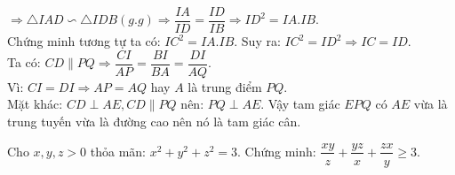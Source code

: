 \begin{ex}
{\begin{enumerate}[a)]
$\Rightarrow \triangle IAD\backsim \triangle IDB(g.g)\Rightarrow \dfrac{IA}{ID}=\dfrac{ID}{IB}\Rightarrow ID^2=IA.IB$.\\
Chứng minh tương tự ta có: $IC^2=IA.IB$. Suy ra: $IC^2=ID^2\Rightarrow IC=ID$.\\
Ta có: $CD\parallel PQ\Rightarrow \dfrac{CI}{AP}=\dfrac{BI}{BA}=\dfrac{DI}{AQ}$.\\
Vì: $CI = DI\Rightarrow AP=AQ$ hay $A$ là trung điểm $PQ$.\\
Mặt khác: $CD\perp AE, CD\parallel PQ$ nên: $PQ\perp AE$. Vậy tam giác $EPQ$ có $AE$ vừa là trung tuyến vừa là đường cao nên nó là tam giác cân.
\end{enumerate}
}
\end{ex}

\begin{ex}%
Cho $x,y,z>0$ thỏa mãn: $x^2+y^2+z^2=3$. Chứng minh:
$\dfrac{xy}{z}+\dfrac{yz}{x}+\dfrac{zx}{y}\geq 3$.
\end{ex}

